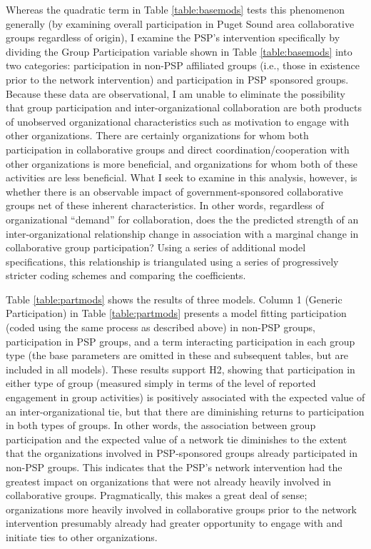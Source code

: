\documentclass[12pt,a4paper,titlepage]{article}
\begin{document}
Whereas the quadratic term in Table \ref{table:basemods} tests this phenomenon generally (by examining overall participation in Puget Sound area collaborative groups regardless of origin), I examine the PSP's intervention specifically by dividing the Group Participation variable shown in Table \ref{table:basemods} into two categories: participation in non-PSP affiliated groups (i.e., those in existence prior to the network intervention) and participation in PSP sponsored groups. Because these data are observational, I am unable to eliminate the possibility that group participation and inter-organizational collaboration are both products of unobserved organizational characteristics such as motivation to engage with other organizations. There are certainly organizations for whom both participation in collaborative groups and direct coordination/cooperation with other organizations is more beneficial, and organizations for whom both of these activities are less beneficial. What I seek to examine in this analysis, however, is whether there is an observable impact of government-sponsored collaborative groups net of these inherent characteristics. In other words, regardless of organizational ``demand'' for collaboration, does the the predicted strength of an inter-organizational relationship change in association with a marginal change in collaborative group participation? Using a series of additional model specifications, this relationship is triangulated using a series of progressively stricter coding schemes and comparing the coefficients.

Table \ref{table:partmods} shows the results of three models. Column 1 (Generic Participation) in Table \ref{table:partmods} presents a model fitting participation (coded using the same process as described above) in non-PSP groups, participation in PSP groups, and a term interacting participation in each group type (the base parameters are omitted in these and subsequent tables, but are included in all models). These results support H2, showing that participation in either type of group (measured simply in terms of the level of reported engagement in group activities) is positively associated with the expected value of an inter-organizational tie, but that there are diminishing returns to participation in both types of groups. In other words, the association between group participation and the expected value of a network tie diminishes to the extent that the organizations involved in PSP-sponsored groups already participated in non-PSP groups. This indicates that the PSP's network intervention had the greatest impact on organizations that were not already heavily involved in collaborative groups. Pragmatically, this makes a great deal of sense; organizations more heavily involved in collaborative groups prior to the network intervention presumably already had greater opportunity to engage with and initiate ties to other organizations.
\end{document}
